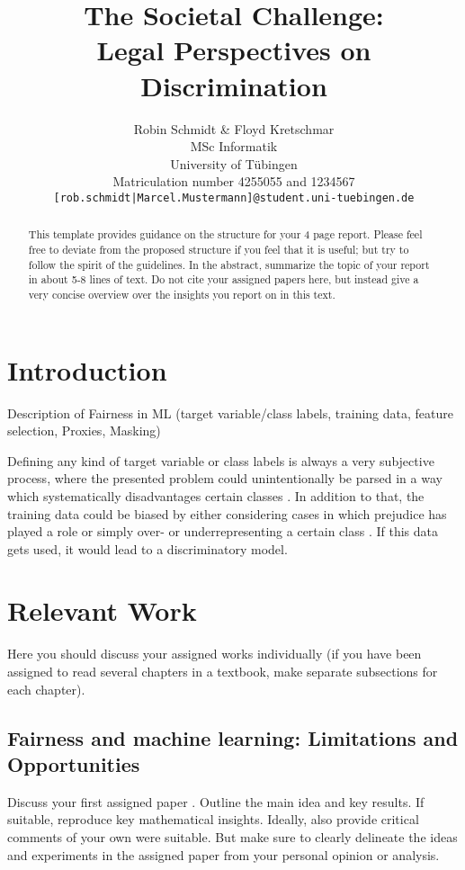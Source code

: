 \documentclass{article}
\title{The Societal Challenge: \\ Legal Perspectives on Discrimination}
\author{%
  Robin Schmidt \& Floyd Kretschmar\\
  MSc Informatik \\
  University of Tübingen\\
  Matriculation number 4255055 and 1234567\\
  \texttt{[rob.schmidt|Marcel.Mustermann]@student.uni-tuebingen.de}
}
\begin{document}
\maketitle

\begin{abstract}
  This template provides guidance on the structure for your 4 page report. Please feel free to deviate from the proposed structure if you feel that it is useful; but try to follow the spirit of the guidelines.
  In the abstract, summarize the topic of your report in about 5-8 lines of text. Do not cite your assigned papers here, but instead give a very concise overview over the insights you report on in this text.
\end{abstract}

\section{Introduction} \label{Introduction}

Description of Fairness in ML (target variable/class labels, training data, feature selection, Proxies, Masking)

Defining any kind of target variable or class labels is always a very subjective process, where the presented problem could unintentionally be parsed in a way which systematically disadvantages certain classes \cite{Barocas.2016}. In addition to that, the training data could be biased by either considering cases in which prejudice has played a role or simply over- or underrepresenting a certain class \cite{Barocas.2016}. If this data gets used, it would lead to a discriminatory model. 

\section{Relevant Work}

Here you should discuss your assigned works individually (if you have been assigned to read several chapters in a textbook, make separate subsections for each chapter).

\subsection{Fairness and machine learning: Limitations and Opportunities}

Discuss your first assigned paper \cite{barocas-hardt-narayanan}. Outline the main idea and key results. If suitable, reproduce key mathematical insights. Ideally, also provide critical comments of your own were suitable. But make sure to clearly delineate the ideas and experiments in the assigned paper from your personal opinion or analysis.
\end{document}
